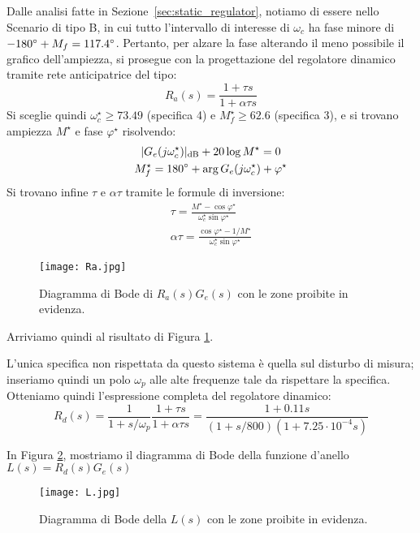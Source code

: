 \documentclass[a4paper, 11pt]{article}
\begin{document}
Dalle analisi fatte in Sezione~\ref{sec:static_regulator}, notiamo di essere nello Scenario di tipo B, in cui tutto l'intervallo di interesse di $\omega_c$ ha fase minore di $-180\degree+M_f = 117.4\degree$.
Pertanto, per alzare la fase alterando il meno possibile il grafico dell'ampiezza, si prosegue con la progettazione del regolatore dinamico tramite rete anticipatrice del tipo:
\[
R_a(s) = \frac{1+\tau s}{1+\alpha\tau s}
\]
Si sceglie quindi $\omega_c^\star \ge 73.49$ (specifica 4) e $M_f^\star \ge 62.6$ (specifica 3), e si trovano ampiezza $M^\star$ e fase $\varphi^\star$ risolvendo:
\begin{subequations}
\begin{gather}
	|G_e(j\omega_c^\star)|_{\text{dB}}+20\log M^\star = 0 \\
	M_f^\star = 180\degree + \arg G_e(j\omega_c^\star) + \varphi^\star
\end{gather}	
\end{subequations}
Si trovano infine $\tau$ e $\alpha\tau$ tramite le formule di inversione:
\begin{subequations}
\begin{gather}
	\tau = \frac{M^\star-\cos\varphi^\star}{\omega_c^\star\sin\varphi^\star} \\
	\alpha\tau = \frac{\cos\varphi^\star-1/M^\star}{\omega_c^\star\sin\varphi^\star}
\end{gather}
\end{subequations}

\begin{figure}[h]
	\centering
	\texttt{[image: Ra.jpg]}
	\caption{Diagramma di Bode di $R_a(s)G_e(s)$ con le zone proibite in evidenza.}
	\label{fig:Ra}
\end{figure}

Arriviamo quindi al risultato di Figura \ref{fig:Ra}.

L'unica specifica non rispettata da questo sistema è quella sul disturbo di misura; inseriamo quindi un polo $\omega_p$ alle alte frequenze tale da rispettare la specifica. Otteniamo quindi l'espressione completa del regolatore dinamico:
\begin{equation}
	R_d(s) = \frac{1}{1+s/\omega_p}\frac{1+\tau s}{1+\alpha\tau s} = \frac{1+0.11s}{(1+s/800)(1+7.25\cdot10^{-4}s)}
\end{equation}

In Figura \ref{fig:L}, mostriamo il diagramma di Bode della funzione d'anello $L(s) = R_d(s) G_e(s)$

\begin{figure}[h]
	\centering
	\texttt{[image: L.jpg]}
	\caption{Diagramma di Bode della $L(s)$ con le zone proibite in evidenza.}
	\label{fig:L}
\end{figure}
\end{document}
